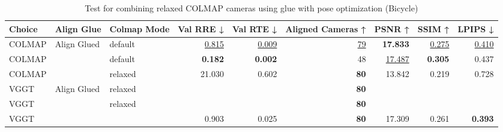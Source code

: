 \begin{table}[H]
\caption{Test for combining relaxed COLMAP cameras using glue with pose optimization (Bicycle)}
\label{tab:99_align_glue_relaxed_pose_opt_bicycle}
\begin{tabular}{lllrrrrrr}
\toprule
Choice & Align Glue & Colmap Mode & Val RRE ↓ & Val RTE ↓ & Aligned Cameras ↑ & PSNR ↑ & SSIM ↑ & LPIPS ↓ \\
\midrule
COLMAP & Align Glued & default & \underline{0.815} & \underline{0.009} & \underline{79} & \textbf{17.833} & \underline{0.275} & \underline{0.410} \\
COLMAP &  & default & \textbf{0.182} & \textbf{0.002} & 48 & \underline{17.487} & \textbf{0.305} & 0.437 \\
COLMAP &  & relaxed & 21.030 & 0.602 & \textbf{80} & 13.842 & 0.219 & 0.728 \\
VGGT & Align Glued & relaxed &  &  & \textbf{80} &  &  &  \\
VGGT &  & relaxed &  &  & \textbf{80} &  &  &  \\
VGGT &  &  & 0.903 & 0.025 & \textbf{80} & 17.309 & 0.261 & \textbf{0.393} \\
\bottomrule
\end{tabular}
\end{table}
